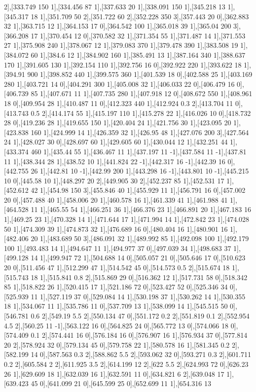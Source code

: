 {2],[333.749 150 1],[334.456 87 1],[337.633 20 1],[338.091 150 1],[345.218 13 1],[345.317 18 1],[351.709 50 2],[351.722 60 2],[352.228 350 3],[357.443 20 0],[362.883 32 1],[363.715 12 1],[364.153 17 0],[364.542 100 1],[365.018 39 1],[365.04 200 3],[366.208 17 1],[370.454 12 0],[370.582 32 1],[371.354 55 1],[371.487 14 1],[371.553 27 1],[375.908 240 1],[378.067 12 1],[379.083 370 1],[379.478 390 1],[383.508 19 1],[384.072 60 1],[384.6 12 1],[384.902 160 1],[385.491 13 1],[387.164 340 1],[388.637 170 1],[391.605 130 1],[392.154 110 1],[392.756 16 0],[392.922 220 1],[393.622 18 1],[394.91 900 1],[398.852 440 1],[399.575 360 1],[401.539 18 0],[402.588 25 1],[403.169 280 1],[403.721 14 0],[404.291 300 1],[405.008 32 1],[406.033 22 0],[406.479 16 0],[406.739 85 1],[407.671 11 1],[407.735 280 1],[407.918 12 0],[408.672 550 1],[408.961 18 0],[409.954 28 1],[410.487 11 0],[412.323 440 1],[412.924 0.3 2],[413.704 11 0],[413.743 0.5 2],[414.174 55 1],[415.197 110 1],[415.278 22 1],[416.026 10 0],[418.732 28 0],[419.236 28 1],[419.655 150 1],[420.404 24 1],[421.756 30 1],[423.095 20 1],[423.838 160 1],[424.999 14 1],[426.359 32 1],[426.95 48 1],[427.076 200 3],[427.564 24 1],[428.027 30 0],[428.697 60 1],[429.605 60 1],[430.044 12 1],[432.251 44 1],[433.374 460 1],[435.44 55 1],[436.467 11 1],[437.197 11 -1],[437.584 11 -1],[437.81 11 1],[438.344 28 1],[438.52 10 1],[441.824 22 -1],[442.317 16 -1],[442.39 16 0],[442.755 26 1],[442.81 10 -1],[442.99 200 1],[443.298 16 -1],[443.801 10 -1],[445.215 10 0],[445.58 10 1],[448.297 20 2],[449.905 30 2],[452.237 85 1],[452.531 17 1],[452.612 42 1],[454.98 150 3],[455.846 40 1],[455.929 11 1],[456.791 16 0],[457.002 20 0],[457.488 40 1],[458.006 20 1],[460.578 16 1],[461.339 41 1],[461.988 41 1],[464.528 11 1],[465.55 54 1],[466.251 36 1],[466.376 23 1],[466.891 20 1],[467.183 16 1],[469.25 23 1],[470.328 14 1],[471.644 17 1],[471.994 14 1],[472.842 23 1],[474.028 50 1],[474.309 39 1],[474.873 32 1],[476.689 16 0],[480.404 16 1],[480.901 16 1],[482.406 20 1],[483.689 50 3],[486.091 32 1],[489.992 85 1],[492.098 100 1],[492.179 100 1],[493.483 14 1],[494.647 11 1],[494.977 37 0],[497.039 34 1],[498.683 37 1],[499.128 14 1],[499.947 72 1],[504.688 14 0],[505.057 21 0],[505.646 17 0],[510.623 20 0],[511.456 47 1],[512.299 47 1],[514.542 45 0],[514.573 0.5 2],[515.674 18 1],[515.743 18 1],[515.841 0.8 2],[515.869 29 0],[516.362 12 1],[517.731 58 0],[518.342 85 1],[518.822 26 1],[520.415 17 1],[521.186 72 0],[523.427 52 0],[525.346 34 0],[525.939 11 1],[527.119 37 0],[529.084 14 1],[530.198 37 1],[530.262 14 1],[530.355 18 1],[534.067 11 1],[535.786 11 0],[537.709 13 1],[538.099 14 1],[545.515 50 0],[546.781 0.6 2],[549.19 5.5 2],[550.134 47 0],[551.172 0.2 2],[551.819 0.1 2],[552.954 4.5 2],[560.25 11 -1],[563.122 16 0],[564.825 24 0],[565.772 13 0],[574.066 18 0],[574.409 0.1 2],[574.441 16 0],[576.184 16 0],[576.907 16 1],[576.934 37 0],[577.814 20 2],[578.924 32 0],[579.134 45 0],[579.758 22 1],[580.578 16 1],[581.345 0.2 2],[582.199 14 0],[587.563 0.3 2],[588.862 5.5 2],[593.062 32 0],[593.271 0.3 2],[601.711 0.2 2],[605.584 2 2],[611.925 3.5 2],[614.199 12 2],[622 5.5 2],[624.993 72 0],[626.23 26 1],[629.609 18 1],[632.039 16 1],[632.591 11 0],[634.821 6 2],[639.048 17 1],[639.423 45 0],[641.099 21 0],[645.599 25 0],[652.699 11 1],[654.316 13 }
